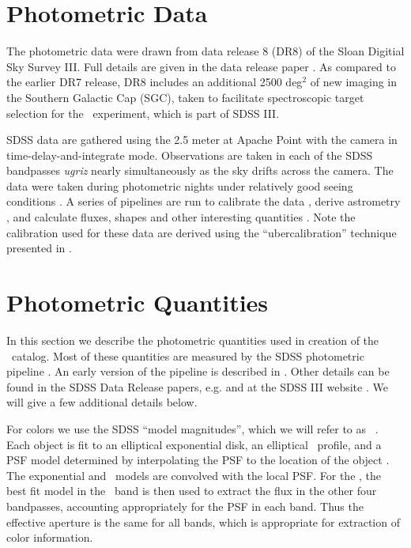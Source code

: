 \documentclass[preprint]{aastex}
\begin{document}
\section{Photometric Data}

The photometric data were drawn from data release 8 (DR8) of the Sloan Digitial
Sky Survey III.  Full details are given in the data release paper \citet{dr8}.
As compared to the earlier DR7 release, DR8 includes an additional 2500
deg$^2$ of new imaging in the Southern Galactic Cap (SGC), %
taken to facilitate spectroscopic target selection for the \boss\ experiment,
which is part of SDSS III.


SDSS data are gathered using the 2.5 meter at Apache Point \citep{Gunn06} with
the camera \citep{Gunn98} in time-delay-and-integrate mode.  Observations are
taken in each of the SDSS bandpasses {\it ugriz} nearly simultaneously as the
sky drifts across the camera.  The data were taken during photometric nights
under relatively good seeing conditions \citep{Hogg01}.  A series of pipelines
are run to calibrate the data \citep{Nikhil08,Smith02,Tucker06}, derive
astrometry \citep{Pier03}, and calculate fluxes, shapes and other interesting
quantities \citep{LuptonADASS01}.  Note the calibration used for these data are
derived using the ``ubercalibration'' technique presented in \citet{Nikhil08}.

\section{Photometric Quantities} \label{sec:photo}

In this section we describe the photometric quantities used in creation of the
\photoz\ catalog.  Most of these quantities are measured by the SDSS
photometric pipeline \photo. An early version of the pipeline is described in
\citet{LuptonADASS01}.  Other details can be found in the SDSS Data Release
papers, e.g. \citet{dr4} and at the SDSS III website \citep{sdssorg}.  We will
give a few additional details below.

For colors we use the SDSS ``model magnitudes'', which we will refer to as
\modelmag\ \citep{dr7photo}.  Each object is fit to an elliptical exponential
disk, an elliptical \devauc\ profile, and a PSF model determined by
interpolating the PSF to the location of the
object \citep{LuptonADASS01,Sheldon04}.  The exponential and \devauc\ models are
convolved with the local PSF.  For the \modelmag, the best fit model in the
\rmag\ band is then used to extract the flux in the other four bandpasses,
accounting appropriately for the PSF in each band. Thus the effective aperture
is the same for all bands, which is appropriate for extraction of color
information.
\end{document}
